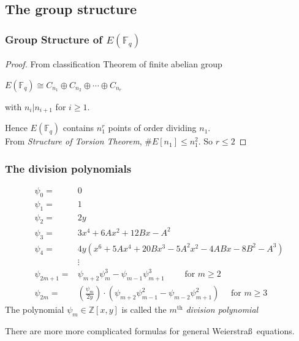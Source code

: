 \documentclass[10pt,final]{beamer} %
\newcommand{\F}{\mathbb F}
\theoremstyle{definition}
\begin{document}
\subsection{The group structure}
\begin{frame}\frametitle{Group Structure of $E(\F_q)$}

\pause

\begin{proof}\pause
From classification Theorem of finite abelian group\\
\centerline{$E(\F_q)\cong  C_{n_1}\oplus C_{n_2}\oplus\cdots\oplus C_{n_r}$}
with $n_i|n_{i+1}$ for $i\ge1$.\pause

Hence $E(\F_q)$ contains $n_1^r$ points of order dividing $n_1$.\pause \\ From
\emph{Structure of Torsion Theorem}, $\#E[n_1]\le n_1^2$.
So $r\le2$\end{proof}

\end{frame}


\begin{frame}\frametitle{The division polynomials}\pause

\begin{Definition}[Division Polynomials of $E:y^2=x^3+Ax+B$]\vspace*{-0.7cm}\pause
\begin{align*}
        \psi_{0} =& 0\\
        \psi_{1} =& 1\\
        \psi_{2} =& 2y\\
        \psi_{3} =& 3x^{4} + 6Ax^{2} + 12Bx - A^{2}\\
        \psi_{4} =& 4y(x^{6} + 5Ax^{4} + 20Bx^{3} - 5A^{2}x^{2} - 4ABx - 8B^{2} - A^{3}) \\
        &\vdots\\
        \psi_{2m+1} =& \psi_{m+2}\psi_{m}^{3}-\psi_{m-1}\psi^{3}_{m+1} \qquad \text{ for } m \geq 2\\
        \psi_{2m}  =& \left(\frac{\psi_{m}}{2y}\right)\cdot(\psi_{m+2}\psi^{2}_{m-1}-\psi_{m-2}\psi^{2}_{m+1}) \quad \text{ for } m \geq 3
\end{align*}
The polynomial $\psi_m\in{\mathbb Z}[x,y]$ is called the $m^{\text{th}}$ \emph{division polynomial}
\end{Definition}\pause

There are more more complicated formulas for general Weierstra\ss\ equations.
\end{frame}
\end{document}
